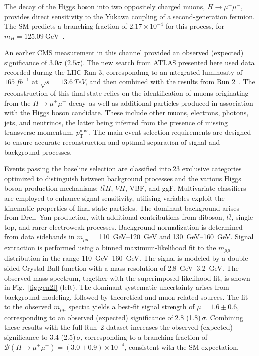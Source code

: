 \documentclass[a4paper,11pt]{article}
\begin{document}
The decay of the Higgs boson into two oppositely charged muons, $H \to
\mu^+\mu^-$, provides direct sensitivity to the Yukawa coupling of a
second-generation fermion. The SM predicts a branching fraction of
$2.17 \times 10^{-4}$ for this process, for $m_H =
125.09~\mathrm{GeV}$~\cite{yr2}.

An earlier CMS measurement in this channel provided an observed
(expected) significance of $3.0\sigma$ ($2.5\sigma$). The new search
from ATLAS presented here used data recorded during the LHC Run-3,
corresponding to an integrated luminosity of $\SI{165}{fb^{-1}}$ at
$\sqrt{s}=\SI{13.6}{TeV}$, and then combined with the results from Run
2~\cite{hmumu-atlas}.  The reconstruction of this final state relies on the
identification of muons originating from the $H \to \mu^+\mu^-$ decay,
as well as additional particles produced in association with the Higgs
boson candidate. These include other muons, electrons, photons, jets,
and neutrinos, the latter being inferred from the presence of missing
transverse momentum, $p_\mathrm{T}^{\text{miss}}$. The main event
selection requirements are designed to ensure accurate reconstruction
and optimal separation of signal and background processes.

Events passing the baseline selection are classified into 23 exclusive
categories optimized to distinguish between background processes and
the various Higgs boson production mechanisms: $t\bar{t}H$, $VH$, VBF,
and ggF. Multivariate classifiers are employed to enhance signal
sensitivity, utilising variables exploit the kinematic properties
of final-state particles.
%
The dominant background arises from Drell--Yan production, with
additional contributions from diboson, $t\bar{t}$, single-top, and
rarer electroweak processes. Background normalization is determined
from data sidebands in $m_{\mu\mu}$ =
\qtyrange[range-phrase=~--~]{110}{120}{GeV} and
\qtyrange[range-phrase=~--~]{130}{160}{GeV}. Signal extraction is
performed using a binned maximum-likelihood fit to the $m_{\mu\mu}$
distribution in the range
\qtyrange[range-phrase=~--~]{110}{160}{GeV}. The signal is modeled by
a double-sided Crystal Ball function with a mass resolution of
\qtyrange[range-phrase=~--~]{2.8}{3.2}{GeV}. The observed mass
spectrum, together with the superimposed likelihood fit, is shown in
Fig.~\ref{fig:gen2f} (left).
%
The dominant systematic uncertainty arises from background modeling,
followed by theoretical and muon-related sources. The fit to the
observed $m_{\mu\mu}$ spectra yields a best-fit signal strength of
$\mu = 1.6 \pm 0.6$, corresponding to an observed (expected)
significance of 2.8 (1.8)\,$\sigma$. Combining these results with the
full Run~2 dataset increases the observed (expected) significance to
3.4 (2.5)\,$\sigma$, corresponding to a branching fraction of $
\mathcal{B}(H \to \mu^+\mu^-) = (3.0 \pm 0.9) \times 10^{-4}$,
consistent with the SM expectation.
\end{document}
